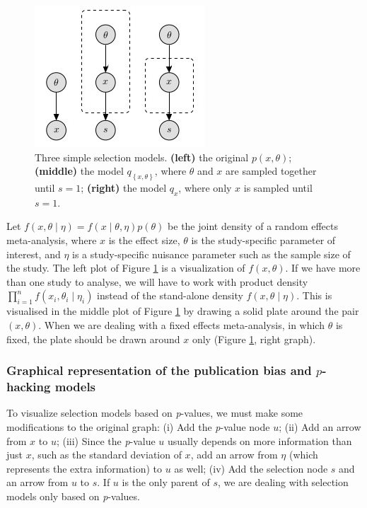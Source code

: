 \documentclass[english]{article}
\begin{document}
\begin{figure}
\begin{center}     
 \includegraphics{plots/figure_A.jpg}
\end{center}
\caption{\label{fig:Plate notation, simple example} Three simple selection models. {\bf (left)} the original $p(x,\theta)$; {\bf (middle)} the model $q_{\left\{ x,\theta\right\} }$, where $\theta$ and $x$ are
sampled together until $s=1$; {\bf (right)} the model $q_{x}$, where only $x$ is sampled until $s=1$.}
\end{figure}

Let $f(x,\theta\mid\eta)=f(x\mid\theta,\eta)p(\theta)$ be the joint density of a random effects meta-analysis, where $x$ is the effect size, $\theta$ is the study-specific parameter of interest, and $\eta$ is a study-specific nuisance parameter such as the sample size of the study. The left plot of Figure \ref{fig:Plate notation, simple example} is a visualization of $f(x,\theta)$. If we have more than one study to analyse, we will have to work with product density $\prod_{i=1}^{n}f(x_{i},\theta_{i}\mid\eta_{i})$ instead of the stand-alone density $f(x,\theta\mid\eta)$. This is visualised in the middle plot of Figure \ref{fig:Plate notation, simple example}  by drawing a solid plate around the pair $(x,\theta)$. When we are dealing with a fixed effects meta-analysis, in which $\theta$ is fixed, the plate should be drawn around $x$ only (Figure \ref{fig:Plate notation, simple example}, right graph). 

\subsubsection*{Graphical representation of the publication bias and $p$-hacking models}

To visualize selection models based on \textit{p}-values, we must make some modifications to the original graph: (i) Add the \textit{p}-value node $u$; (ii) Add an arrow from $x$ to $u$; (iii) Since the \textit{p}-value $u$ usually depends on more information than just $x$, such as the standard deviation of $x$, add an arrow from $\eta$ (which represents the extra information) to $u$ as well; (iv) Add the selection node $s$ and an arrow from $u$ to $s$. If $u$ is the only parent of $s$, we are dealing with selection models only based on \textit{p}-values.
\end{document}
